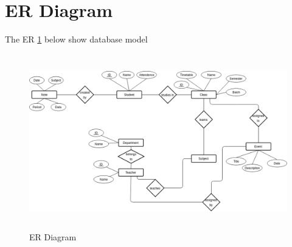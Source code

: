 \section{ER Diagram}

The ER \ref{fig:er} below show database model

\vspace{1em}

\begin{figure}[H]
\centering
\includegraphics[height=3in, clip=true]{./er}
\caption{ER Diagram}
\label{fig:er}
\end{figure}
